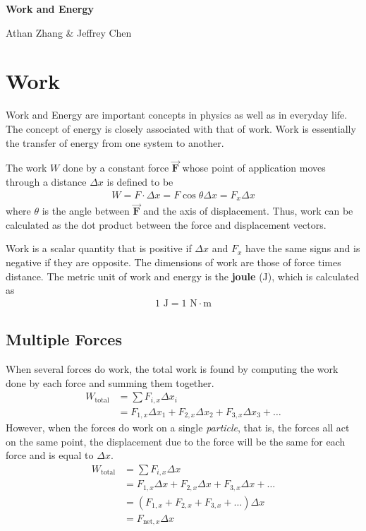 \documentclass[11pt]{article}
\begin{document}
\textbf{\Huge Work and Energy}

Athan Zhang \& Jeffrey Chen

\section{Work}

Work and Energy are important concepts in physics as well as in everyday life. The concept of energy is closely associated with that of work. Work is essentially the transfer of energy from one system to another. 

The work $W$ done by a constant force $\mathbf{\Vec{F}}$ whose point of application moves through a distance $\Delta x$ is defined to be
\begin{align*}
    W = F\cdot \Delta x = F\cos\theta \Delta x = F_x \Delta x
\end{align*}
where $\theta$ is the angle between $\mathbf{\Vec{F}}$ and the axis of displacement. Thus, work can be calculated as the dot product between the force and displacement vectors. 

Work is a scalar quantity that is positive if $\Delta x$ and $F_x$ have the same signs and is negative if they are opposite. The dimensions of work are those of force times distance. The metric unit of work and energy is the \textbf{joule} (J), which is calculated as
\begin{align*}
    1 \text{ J} = 1 \text{ N}\cdot \text{m}
\end{align*}

\subsection{Multiple Forces}

When several forces do work, the total work is found by computing the work done by each force and summing them together.
\begin{align*}
    \displaystyle W_\text{total} &= \sum F_{i,x} \Delta x_{i} \\
    &= F_{1,x}\Delta x_1 + F_{2,x}\Delta x_2 + F_{3,x}\Delta x_3 + \dots
\end{align*}
However, when the forces do work on a single \textit{particle}, that is, the forces all act on the same point, the displacement due to the force will be the same for each force and is equal to $\Delta x$.
\begin{align*}
    W_\text{total} &= \sum F_{i,x} \Delta x \\
    &=  F_{1,x}\Delta x + F_{2,x}\Delta x + F_{3,x}\Delta x + \dots \\
    &= (F_{1,x} + F_{2,x} + F_{3,x} + \dots)\Delta x \\
    &= F_{\text{net},x}\Delta x
\end{align*}
\end{document}

